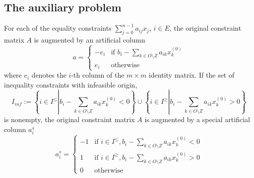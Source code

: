 \documentclass[a4paper]{article}
\begin{document}
\subsection{The auxiliary problem}
For each of the equality constraints $\sum_{j=0}^{n-1}a_{ij}x_{j}$, $i \in E$,
the original constraint matrix $A$ is augmented by an artificial column 
\begin{equation}
a= \left\{
\begin{array}{ll}
-e_{i}
&
\mbox{if $b_{i}-\sum_{k \in O \setminus Z}a_{ik}x_{k}^{(0)}$} \\
e_{i}
&
\mbox{otherwise}
\end{array}
\right.
\end{equation}
where $e_{i}$ denotes the $i$-th column of the $m \times m$ identity matrix. If the set of inequality constraints with infeasible origin, 
\begin{equation}
I_{inf}:=
\left\{
  i \in I^{\leq}\left|\right.
  b_{i}-\sum_{k \in O \setminus Z}a_{ik}x_{k}^{(0)} < 0
\right\}
\cup
\left\{
  i \in I^{\geq} \left|\right.
  b_{i}-\sum_{k \in O \setminus Z}a_{ik}x_{k}^{(0)} > 0
\right\}
\end{equation}
is nonempty, the original constraint matrix $A$ is augmented by a special artificial column $a_{i}^{s}$
\begin{equation}
a_{i}^{s}= \left\{
\begin{array}{ll}
-1
&
\mbox{if $i \in I^{\leq}, b_{i}-\sum_{k \in O \setminus Z}a_{ik}
    x_{k}^{(0)}<0$} \\
1
&
\mbox{if $i \in I^{\geq}, b_{i}-\sum_{k \in O \setminus Z}a_{ik}
   x_{k}^{(0)}>0$} \\
0
&
\mbox{otherwise}
\end{array}
\right.
\end{equation}
\end{document}
